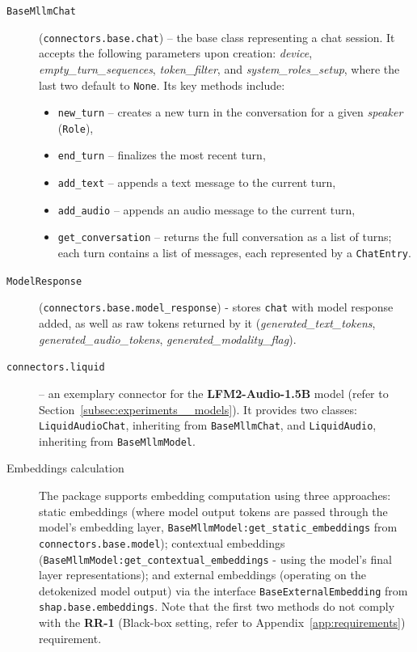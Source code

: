 \begin{appendices}
\begin{description}
    \item[\texttt{BaseMllmChat}] (\texttt{connectors.base.chat}) -- the base class representing a chat session. It accepts the following parameters upon creation: \textit{device}, \textit{empty\_turn\_sequences}, \textit{token\_filter}, and \textit{system\_roles\_setup}, where the last two default to \texttt{None}. Its key methods include:
        \begin{itemize}
            \item \texttt{new\_turn} -- creates a new turn in the conversation for a given \textit{speaker} (\texttt{Role}),
            \item \texttt{end\_turn} -- finalizes the most recent turn,
            \item \texttt{add\_text} -- appends a text message to the current turn,
            \item \texttt{add\_audio} -- appends an audio message to the current turn,
            \item \texttt{get\_conversation} -- returns the full conversation as a list of turns;
                  each turn contains a list of messages, each represented by a \texttt{ChatEntry}.
        \end{itemize}

    \item[\texttt{ModelResponse}] (\texttt{connectors.base.model\_response}) - stores \texttt{chat} with model response added, as well as raw tokens returned by it (\textit{generated\_text\_tokens}, \textit{generated\_audio\_tokens}, \textit{generated\_modality\_flag}).

    \item[\texttt{connectors.liquid}] -- an exemplary connector for the \textbf{LFM2-Audio-1.5B} model (refer to Section~\ref{subsec:experiments__models}). It provides two classes: \texttt{LiquidAudioChat}, inheriting from \texttt{BaseMllmChat}, and \texttt{LiquidAudio}, inheriting from \texttt{BaseMllmModel}.

    \item[Embeddings calculation] The package supports embedding computation using three approaches: static embeddings (where model output tokens are passed through the model's embedding layer, \texttt{BaseMllmModel:get\_static\_embeddings} from \texttt{connectors.base.model}); contextual embeddings (\texttt{BaseMllmModel:get\_contextual\_embeddings} - using the model’s final layer representations); and external embeddings (operating on the detokenized model output) via the interface \texttt{BaseExternalEmbedding} from \texttt{shap.base.embeddings}. Note that the first two methods do not comply with the \textbf{RR-1} (Black-box setting, refer to Appendix~\ref{app:requirements}) requirement.


\end{description}
\end{appendices}

